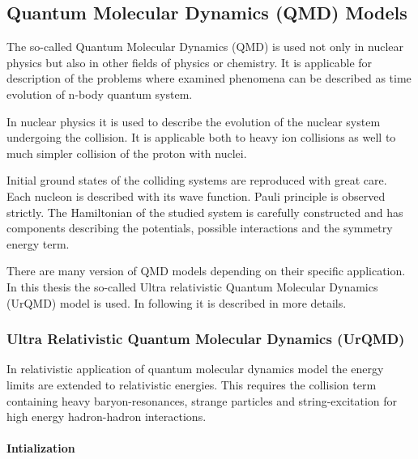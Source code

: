 \subsection{Quantum Molecular Dynamics (QMD) Models}

The so-called Quantum Molecular Dynamics (QMD) is used not only in nuclear physics but also in other fields of physics or chemistry. It is applicable for description of the problems where examined phenomena can be described as time evolution of n-body quantum system.

In nuclear physics it is used to describe the evolution of the nuclear system undergoing the collision. It is applicable both to heavy ion collisions as well to much simpler collision of the proton with nuclei.

Initial ground states of the colliding systems are reproduced with great care. Each nucleon is described with its wave function. Pauli principle is observed strictly.   
The Hamiltonian of the studied system is carefully constructed 
and has components describing the potentials, possible 
interactions and the symmetry energy term.  

There are many version of QMD models depending on their specific 
application. In this thesis the so-called Ultra relativistic 
Quantum Molecular Dynamics (UrQMD) \cite{UrQMDBASS1998} model is used. In following it 
is described in more details.

\subsubsection{Ultra Relativistic Quantum Molecular Dynamics (UrQMD)}

In relativistic application of quantum molecular dynamics model 
the energy limits are extended to relativistic energies. This requires the collision term containing heavy baryon-resonances, strange particles and string-excitation for high energy hadron-hadron interactions. \\
 \ \\
\textbf{Intialization}



